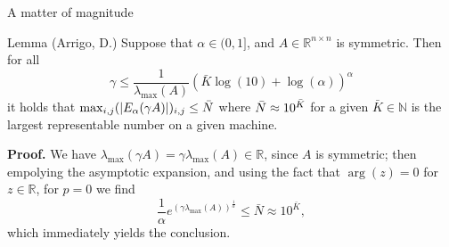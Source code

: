 \documentclass[aspectratio=169,xcolor=dvipsnames]{beamer}
\begin{document}
\begin{frame}{\faHammer\; A matter of magnitude}

\begin{block}{Lemma (Arrigo, D.)}
Suppose that $\alpha \in (0,1]$, and $A  \in \mathbb{R}^{n \times n}$ is symmetric. Then for all 
\[\gamma \leq \frac{1}{\lambda_{\max}(A)}\left(\bar{K}\log(10) + \log(\alpha)\right)^\alpha\]
it holds that $\max_{i,j}(|E_{\alpha}(\gamma A)|)_{i,j} \leq \Bar{N}$ where $\Bar{N} \approx 10^{\Bar{K}}$ for a given $\bar{K} \in \mathbb{N}$ is the largest representable number on a given machine.
\end{block}

\textbf{Proof.} We have $\lambda_{\max}(\gamma A) =\gamma \lambda_{\max}(A) \in \mathbb{R}$, since $A$ is symmetric; then empolying the asymptotic expansion, and using the fact that $\arg(z) = 0$ for $z \in \mathbb{R}$, for $p = 0$ we find   
	\begin{equation*}
	\frac{1}{\alpha} e^{(\gamma\lambda_{\max}(A))^{\frac{1}{\alpha}}} \leq \bar{N} \approx 10^{\bar{K}}, 
	\end{equation*}
    which immediately yields the conclusion.
\end{frame}
\end{document}
